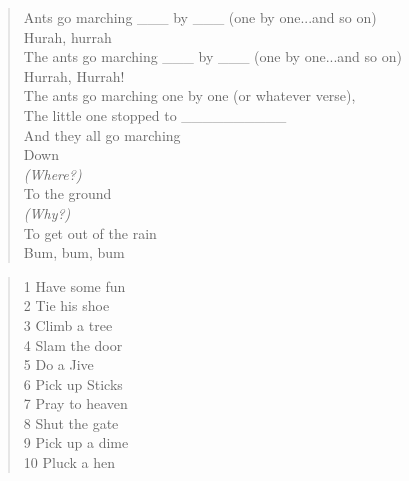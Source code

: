 
\begin{verse}
Ants go marching \_\_\_ by \_\_\_ (one by one...and so on) \\

Hurah, hurrah \\

The ants go marching \_\_\_ by \_\_\_ (one by one...and so on) \\

Hurrah, Hurrah! \\

The ants go marching one by one (or whatever verse), \\

The little one stopped to \_\_\_\_\_\_\_\_\_\_ \\

And they all go marching \\

Down \\

\textit{(Where?)} \\

To the ground \\

\textit{(Why?)} \\

To get out of the rain \\

Bum, bum, bum \\
\end{verse}

\begin{verse}
1 Have some fun \\
2 Tie his shoe \\
3 Climb a tree \\
4 Slam the door \\
5 Do a Jive \\
6 Pick up Sticks \\
7 Pray to heaven \\
8 Shut the gate \\
9 Pick up a dime \\
10 Pluck a hen \\
\end{verse}
